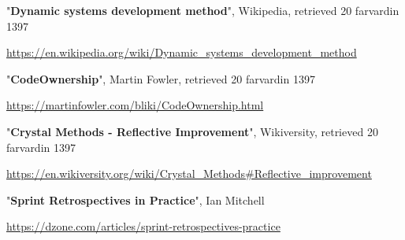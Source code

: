 \begin{thebibliography}{8}

"\textbf{Dynamic systems development method}", Wikipedia, retrieved 20 farvardin 1397

\url{https://en.wikipedia.org/wiki/Dynamic_systems_development_method}



"\textbf{CodeOwnership}", Martin Fowler, retrieved 20 farvardin 1397

\url{https://martinfowler.com/bliki/CodeOwnership.html}



"\textbf{Crystal Methods - Reflective Improvement}", Wikiversity, retrieved 20 farvardin 1397

\url{https://en.wikiversity.org/wiki/Crystal_Methods#Reflective_improvement}



"\textbf{Sprint Retrospectives in Practice}", Ian Mitchell

\url{https://dzone.com/articles/sprint-retrospectives-practice}




\end{thebibliography}




